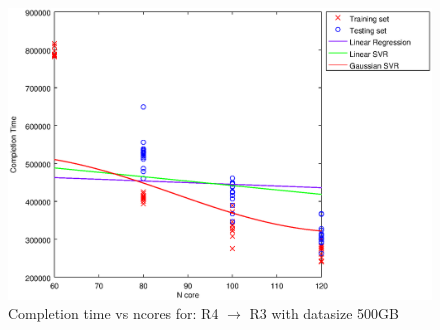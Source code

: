 
\begin {figure}[hbtp]
\centering
\includegraphics[width=\textwidth]{output/R4_R3_500_ALL_FEATURES/plot_R4_R3_500_bestmodels.eps}
\caption{Completion time vs ncores for: R4 $\rightarrow$ R3 with datasize 500GB}
\label{fig:coreonly_linear_R4_R3_500}
\end {figure}
